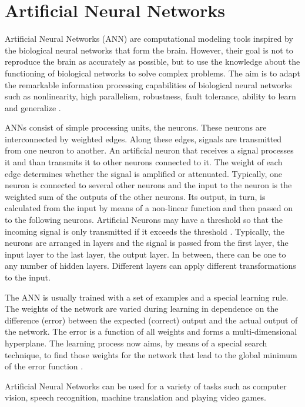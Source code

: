 \documentclass[11pt]{report}
\begin{document}
\section{Artificial Neural Networks}
Artificial Neural Networks (ANN) are computational modeling tools inspired by the
biological neural networks that form the brain. However, their goal is not to
reproduce the brain as accurately as possible, but to use the knowledge about
the functioning of biological networks to solve complex problems. The aim is to
adapt the remarkable information processing capabilities of biological neural
networks such as nonlinearity, high parallelism, robustness, fault tolerance,
ability to learn and generalize \cite{basheer2000artificial}.

ANNs consist of simple processing units, the neurons. These neurons are
interconnected by weighted edges. Along these edges, signals are transmitted
from one neuron to another. An artificial neuron that receives a signal
processes it and than transmits it to other neurons connected to it. The weight
of each edge determines whether the signal is amplified or attenuated.
Typically, one neuron is connected to several other neurons and the input to the
neuron is the weighted sum of the outputs of the other neurons. Its output, in
turn, is calculated from the input by means of a non-linear function and then
passed on to the following neurons. Artificial Neurons may have a threshold so that
the incoming signal is only transmitted if it exceeds the threshold
\cite{Kriesel2007NeuralNetworks}. Typically, the neurons are arranged in layers
and the signal is passed from the first layer, the input layer to the last
layer, the output layer. In between, there can be one to any number of hidden
layers. Different layers can apply different transformations to the input.

The ANN is usually trained with a set of examples and a special learning rule.
The weights of the network are varied during learning in dependence on the
difference (error) between the expected (correct) output and the actual output
of the network. The error is a function of all weights and forms a
multi-dimensional hyperplane. The learning process now aims, by means of a
special search technique, to find those weights for the network that lead to the
global minimum of the error function \cite{basheer2000artificial}.

Artificial Neural Networks can be used for a variety of tasks such as computer
vision, speech recognition, machine translation and playing video games. 
\end{document}
